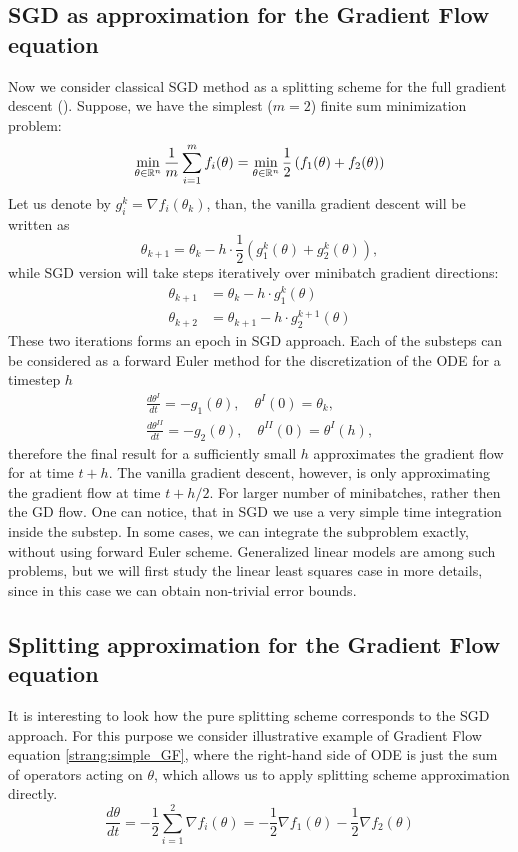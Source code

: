 \documentclass{article} %
\begin{document}
\subsection{SGD as approximation for the Gradient Flow equation}
Now we consider classical SGD method as a splitting scheme for the full gradient descent (\cite{cauchy1847methode}). Suppose, we have the simplest ($m=2$) finite sum minimization problem:
$$
\min_{\theta \in {\mathbb{R}}^n} \dfrac{1}{m}\sum\limits_{i=1}^m f_i(\theta) = \min_{\theta \in {\mathbb{R}}^n} \frac{1}{2} \left( f_1(\theta) + f_2(\theta)\right)
$$
Let us denote by $g_i^k = \nabla f_i(\theta_k)$, than, the vanilla gradient descent will be written as
$$
\theta_{k+1} = \theta_k - h\cdot\frac{1}{2} \left( g^k_1(\theta) + g^k_2(\theta)\right),
$$
while SGD version will take steps iteratively over minibatch gradient directions:
\begin{align*}\label{strang:sgd2}
\theta_{k+1} &= \theta_k - h\cdot g^k_1(\theta) \\
\theta_{k+2} &= \theta_{k+1} - h\cdot  g^{k+1}_2(\theta)
\end{align*}
These two iterations forms an epoch in SGD approach. Each of the substeps can be considered as a forward Euler method for the discretization of the ODE for a timestep $h$
\begin{align*}
    \frac{d \theta^I}{d t} = -g_1(\theta), \quad \theta^I(0) = \theta_{k},\\
    \frac{d \theta^{II}}{d t} = -g_2(\theta), \quad \theta^{II}(0) = \theta^{I}(h),
\end{align*}
therefore the final result for a sufficiently small $h$ approximates the gradient flow for at time $t + h$. The vanilla gradient descent, however, is only approximating the gradient flow at time $t + h/2$. For larger number of minibatches, rather then the GD flow. One can notice, that in SGD we use a very simple time integration inside the substep. In some cases, we can integrate the subproblem exactly, without using forward Euler scheme. Generalized linear models are among such problems, but we will first study the linear least squares case in more details, since in this case we can obtain non-trivial error bounds.

\subsection{Splitting approximation for the Gradient Flow equation}

It is interesting to look how the pure splitting scheme corresponds to the SGD approach. For this purpose we consider illustrative example of Gradient Flow equation \ref{strang:simple_GF}, where the right-hand side of ODE is just the sum of operators acting on $\theta$, which allows us to apply splitting scheme approximation directly.
\begin{equation}
\label{strang:simple_GF}
\dfrac{d \theta}{d t} = -\dfrac{1}{2} \sum\limits_{i=1}^2 \nabla f_i (\theta) = - \dfrac{1}{2} \nabla f_1 (\theta) -\dfrac{1}{2}  \nabla f_2 (\theta)
\end{equation}
\end{document}

